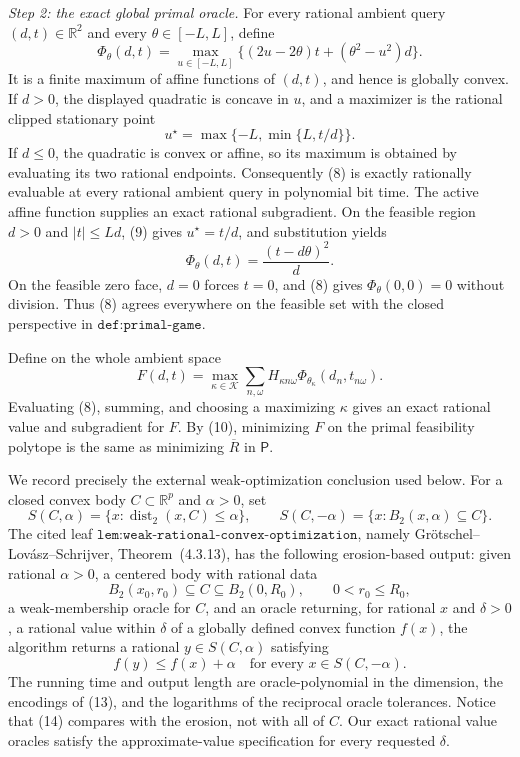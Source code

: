 \emph{Step 2: the exact global primal oracle.}
For every rational ambient query \((d,t)\in\mathbb R^2\) and every \(\theta\in[-L,L]\), define
\[
 \Phi_\theta(d,t)
 =\max_{u\in[-L,L]}
 \bigl\{(2u-2\theta)t+(\theta^2-u^2)d\bigr\}.
\tag{8}
\]
It is a finite maximum of affine functions of \((d,t)\), and hence is globally convex.  If \(d>0\), the displayed quadratic is concave in \(u\), and a maximizer is the rational clipped stationary point
\[
 u^\star=\max\{-L,\min\{L,t/d\}\}.
\tag{9}
\]
If \(d\le0\), the quadratic is convex or affine, so its maximum is obtained by evaluating its two rational endpoints.  Consequently (8) is exactly rationally evaluable at every rational ambient query in polynomial bit time.  The active affine function supplies an exact rational subgradient.  On the feasible region \(d>0\) and \(|t|\le Ld\), (9) gives \(u^\star=t/d\), and substitution yields
\[
 \Phi_\theta(d,t)=\frac{(t-d\theta)^2}{d}.
\tag{10}
\]
On the feasible zero face, \(d=0\) forces \(t=0\), and (8) gives \(\Phi_\theta(0,0)=0\) without division.  Thus (8) agrees everywhere on the feasible set with the closed perspective in \(\texttt{def:primal-game}\).

Define on the whole ambient space
\[
 F(d,t)=\max_{\kappa\in\mathcal K}
 \sum_{n,\omega}H_{\kappa n\omega}
       \Phi_{\theta_\kappa}(d_n,t_{n\omega}).
\tag{11}
\]
Evaluating (8), summing, and choosing a maximizing \(\kappa\) gives an exact rational value and subgradient for \(F\).  By (10), minimizing \(F\) on the primal feasibility polytope is the same as minimizing \(\overline R\) in \(\mathsf P\).

We record precisely the external weak-optimization conclusion used below.  For a closed convex body \(C\subset\mathbb R^p\) and \(\alpha>0\), set
\[
 S(C,\alpha)=\{x:\operatorname{dist}_2(x,C)\le\alpha\},
 \qquad
 S(C,-\alpha)=\{x:B_2(x,\alpha)\subseteq C\}.
\tag{12}
\]
The cited leaf \(\texttt{lem:weak-rational-convex-optimization}\), namely Gr\"otschel--Lov\'asz--Schrijver, Theorem~(4.3.13), has the following erosion-based output: given rational \(\alpha>0\), a centered body with rational data
\[
 B_2(x_0,r_0)\subseteq C\subseteq B_2(0,R_0),
 \qquad 0<r_0\le R_0,
\tag{13}
\]
a weak-membership oracle for \(C\), and an oracle returning, for rational \(x\) and \(\delta>0\), a rational value within \(\delta\) of a globally defined convex function \(f(x)\), the algorithm returns a rational \(y\in S(C,\alpha)\) satisfying
\[
 f(y)\le f(x)+\alpha
 \quad\text{for every }x\in S(C,-\alpha).
\tag{14}
\]
The running time and output length are oracle-polynomial in the dimension, the encodings of (13), and the logarithms of the reciprocal oracle tolerances.  Notice that (14) compares with the erosion, not with all of \(C\).  Our exact rational value oracles satisfy the approximate-value specification for every requested \(\delta\).

